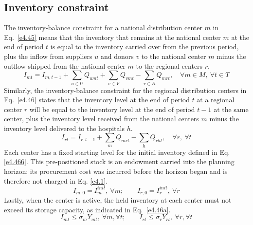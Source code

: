 \documentclass[a4paper]{elsarticle}
\begin{document}
{\subsection{Inventory constraint}
The inventory-balance constraint for a national distribution center $m$ in Eq.~\ref{e4.45} means that the inventory that remains at the national center $m$ at the end of period $t$ is equal to the inventory carried over from the previous period, plus the inflow from suppliers $u$ and donors $v$ to the national center $m$ minus the outflow shipped from the national center $m$ to the regional centers $r$.
\begin{equation}
\label{e4.45}
I_{mt} = I_{m,t-1} + \sum_{u \in U} Q_{umt} + \sum_{v \in V} Q_{vmt} - \sum_{r \in R} Q_{mrt}, \quad \forall m \in M,\ \forall t \in T
\end{equation}
Similarly, the inventory-balance constraint for the regional distribution centers in Eq.~\ref{e4.46} states that the inventory level at the end of period $t$ at a regional center $r$ will be equal to the inventory level at the end of period $t-1$ at the same center, plus the inventory level received from the national centers $m$ minus the inventory level delivered to the hospitals $h$.
\begin{equation}
I_{rt} = I_{r,t-1} + \sum_{m} Q_{mrt} - \sum_{h} Q_{rht}, \quad \forall r,\ \forall t
\label{e4.46}
\end{equation}
Each center has a fixed starting level for the initial inventory defined in Eq. \ref{e4.466}. This pre-positioned stock is an endowment carried into the planning horizon; its procurement cost was incurred before the horizon began and is therefore not charged in Eq. \ref{e4.1}.
\begin{equation}
\label{e4.466}
I_{m,0} = I^{init}_{m},\ \forall m; \qquad I_{r,0} = I^{init}_{r},\ \forall r
\end{equation}
Lastly, when the center is active, the held inventory at each center must not exceed its storage capacity, as indicated in Eq.~\ref{e4.46a}.
\begin{equation}
\label{e4.46a}
I_{mt} \leq \sigma_{m} Y_{mt},\ \forall m,\forall t; \qquad I_{rt} \leq \sigma_{r} Y_{rt},\ \forall r,\forall t
\end{equation}
}
\end{document}
